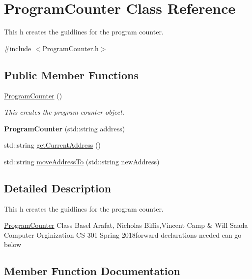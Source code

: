 \hypertarget{class_program_counter}{}\section{Program\+Counter Class Reference}
\label{class_program_counter}


This h creates the guidlines for the program counter.  




{\ttfamily \#include $<$Program\+Counter.\+h$>$}

\subsection*{Public Member Functions}
\begin{DoxyCompactItemize}
\item 
\mbox{\label{class_program_counter_a63c70e470925203e4c15c861a7afca3a}} 
\mbox{\hyperlink{class_program_counter_a63c70e470925203e4c15c861a7afca3a}{Program\+Counter}} ()
\begin{DoxyCompactList}\small\item\em This creates the program counter object. \end{DoxyCompactList}\item 
\mbox{\label{class_program_counter_a80ea9c67bfdae62206491d69048ef36c}} 
{\bfseries Program\+Counter} (std\+::string address)
\item 
std\+::string \mbox{\hyperlink{class_program_counter_aaf3484382a00597d8548f5af9b56b881}{get\+Current\+Address}} ()
\item 
std\+::string \mbox{\hyperlink{class_program_counter_ac2587f6e388a7176d4e2dde5231924e0}{move\+Address\+To}} (std\+::string new\+Address)
\end{DoxyCompactItemize}


\subsection{Detailed Description}
This h creates the guidlines for the program counter. 

\mbox{\hyperlink{class_program_counter}{Program\+Counter}} Class Basel Arafat, Nicholas Biffis,Vincent Camp \& Will Saada Computer Orginization CS 301 Spring 2018forward declarations needed can go below 

\subsection{Member Function Documentation}
\mbox{\label{class_program_counter_aaf3484382a00597d8548f5af9b56b881}} 

